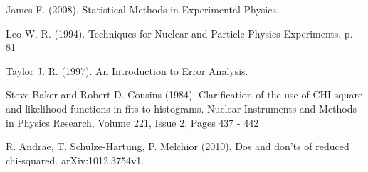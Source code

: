 \documentclass[12pt,a4paper]{report}
\begin{document}
\medskip

\begin{thebibliography}{99}

James F. (2008). Statistical Methods in Experimental Physics.

Leo W. R. (1994). Techniques for Nuclear and Particle Physics Experiments. p. 81

Taylor J. R. (1997). An Introduction to Error Analysis. 

Steve Baker and Robert D. Cousins (1984). Clarification of the use of CHI-square and likelihood functions in fits to histograms. Nuclear Instruments and Methods in Physics Research, Volume 221, Issue 2, Pages 437 - 442 

R. Andrae, T. Schulze-Hartung, P. Melchior (2010). Dos and don’ts of reduced chi-squared. arXiv:1012.3754v1. 

\end{thebibliography}
\end{document}
